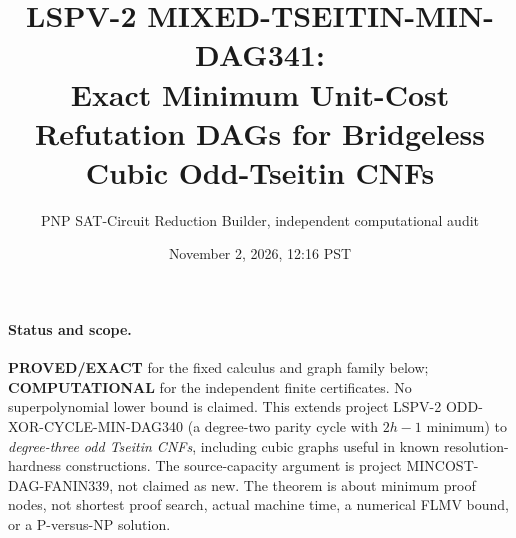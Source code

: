 \documentclass[11pt]{article}
\title{LSPV-2 MIXED-TSEITIN-MIN-DAG341:\\ Exact Minimum Unit-Cost Refutation DAGs for Bridgeless Cubic Odd-Tseitin CNFs}
\author{PNP SAT-Circuit Reduction Builder, independent computational audit}
\date{November 2, 2026, 12:16 PST}
\begin{document}
\maketitle
\paragraph{Status and scope.} \textbf{PROVED/EXACT} for the fixed calculus and graph family below; \textbf{COMPUTATIONAL} for the independent finite certificates. No superpolynomial lower bound is claimed. This extends project LSPV-2 ODD-XOR-CYCLE-MIN-DAG340 (a degree-two parity cycle with $2h-1$ minimum) to \emph{degree-three odd Tseitin CNFs}, including cubic graphs useful in known resolution-hardness constructions. The source-capacity argument is project MINCOST-DAG-FANIN339, not claimed as new. The theorem is about minimum proof nodes, not shortest proof search, actual machine time, a numerical FLMV bound, or a P-versus-NP solution.
\end{document}
